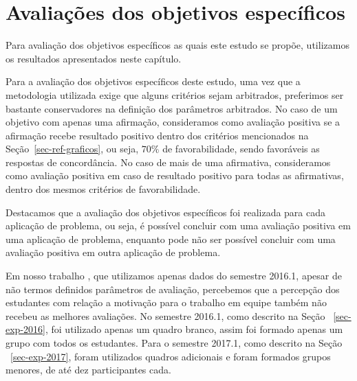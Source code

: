 \section{Avaliações dos objetivos específicos}
\label{sec-avaliacao-hipoteses}
Para avaliação dos objetivos específicos as quais este estudo se propõe,
utilizamos os resultados apresentados neste capítulo.

Para a avaliação dos objetivos específicos deste estudo, uma vez que a
metodologia utilizada exige que alguns critérios sejam
arbitrados, preferimos ser bastante conservadores
na definição dos parâmetros arbitrados.
No caso de um objetivo com apenas uma afirmação, consideramos
como avaliação positiva se a afirmação recebe
resultado positivo dentro dos critérios mencionados na
Seção~\ref{sec-ref-graficos}, ou seja, $70\%$ de favorabilidade,
sendo favoráveis as respostas de concordância.
No caso de mais de uma afirmativa, consideramos
como avaliação positiva em caso de resultado positivo para todas
as afirmativas, dentro dos mesmos critérios de favorabilidade.

Destacamos que a avaliação dos objetivos específicos foi realizada para
cada aplicação de problema, ou seja, é possível concluir com
uma avaliação positiva em uma aplicação de problema, enquanto pode
não ser possível concluir com uma avaliação positiva em outra aplicação
de problema.


\AprovacaoObjetivoResultado{}{}{}{}{}{}{}{}{}


Em nosso trabalho \cite{gavaza2017}, que utilizamos apenas dados do
semestre 2016.1, apesar de não termos definidos parâmetros
de avaliação, percebemos que a percepção dos estudantes com relação
a motivação para o trabalho em equipe também não recebeu as melhores
avaliações.
No semestre 2016.1, como descrito na Seção ~\ref{sec-exp-2016}, foi utilizado
apenas um quadro branco, assim foi formado apenas um grupo com todos
os estudantes.
Para o semestre 2017.1, como descrito na Seção ~\ref{sec-exp-2017}, foram
utilizados quadros adicionais e foram formados grupos menores,
de até dez participantes cada.

